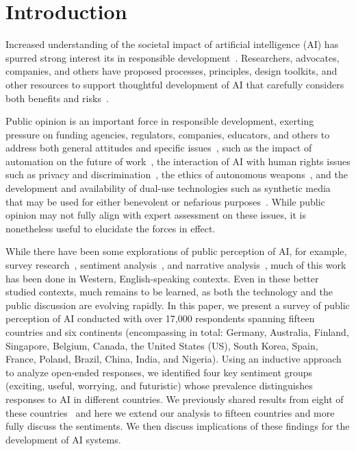 \documentclass[11pt]{article} %
\begin{document}
\section{Introduction}
Increased understanding of the societal impact of artificial intelligence (AI) has spurred strong interest its in responsible development~\cite{dietterich2015rise,hawking2014,horvitz2012interim, stone2016artificial}.
Researchers, advocates, companies, and others have proposed processes, principles, design toolkits, and other resources to support thoughtful development of AI that carefully considers both benefits and risks~\cite{abrassart2018, fjeld2020, highlevel2019,jobin2019,scuEthics,googleAI,princetonEthics,ethicalOS}.

Public opinion is an important force in responsible development, exerting pressure on funding agencies, regulators, companies, educators, and others to address both general attitudes and specific issues~\cite{castro2019, cave2018portrayals,ouchchy2020,zhang2022}, such as the impact of automation on the future of work~\cite{brynjolfsson2014second, raghavan2020, sanchez-mondero2020},  the interaction of AI with human rights issues such as privacy and discrimination~\cite{abrassart2018, barabas2018, buolamwini2018, chancellor2019}, the ethics of autonomous weapons~\cite{scharre2018army, west2018}, and the development and availability of dual-use technologies such as synthetic media that may be used for either benevolent or nefarious purposes~\cite{openAI2019}. While public opinion may not fully align with expert assessment on these issues, it is nonetheless useful to elucidate the forces in effect.

 While there have been some explorations of public perception of AI, for example, survey research~\cite{arm2017, blumberg2019, cave2019, ipsos2019, mozilla2019, northeastern2018, west2018, zhang2019artificial}, sentiment analysis~\cite{chuan2019, fast2017long, garvey2019sentiment, ouchchy2020}, and narrative analysis~\cite{cave2018portrayals, cave2020narratives}, much of this work has been done in Western, English-speaking contexts. Even in these better studied contexts, much remains to be learned, as both the technology and the public discussion are evolving rapidly. In this paper, we present a survey of public perception of AI conducted with over 17,000 respondents spanning fifteen countries and six continents (encompassing in total: Germany, Australia, Finland, Singapore, Belgium, Canada, the United States (US), South Korea, Spain, France, Poland, Brazil, China, India, and Nigeria). Using an inductive approach to analyze open-ended responses, we identified four key sentiment groups (exciting, useful, worrying, and futuristic) whose prevalence distinguishes responses to AI in different countries. We previously shared results from eight of these countries~\cite{kelley2021} and here we extend our analysis to fifteen countries and more fully discuss the sentiments. We then discuss implications of these findings for the development of AI systems. 
\end{document}

